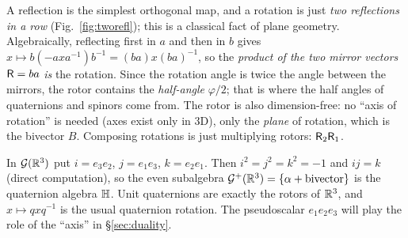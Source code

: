 

\begin{intuition}
A reflection is the simplest orthogonal map, and a rotation is just \emph{two reflections in a row} (Fig.~\ref{fig:tworefl}); this is a classical fact of plane geometry.
Algebraically, reflecting first in $a$ and then in $b$ gives $x\mapsto b(-axa^{-1})b^{-1}=(ba)x(ba)^{-1}$, so the \emph{product of the two mirror vectors} $\mathsf{R}=ba$ \emph{is} the rotation.
Since the rotation angle is twice the angle between the mirrors, the rotor contains the \emph{half-angle} $\varphi/2$; that is where the half angles of quaternions and spinors come from. The rotor is also dimension-free: no ``axis of rotation'' is needed (axes exist only in $3$D), only the \emph{plane} of rotation, which is the bivector $B$. Composing rotations is just multiplying rotors: $\mathsf{R}_2\mathsf{R}_1$.
\end{intuition}

\begin{example}
In $\mathcal{G}(\mathbb{R}^3)$ put $i=e_3e_2$, $j=e_1e_3$, $k=e_2e_1$. Then $i^2=j^2=k^2=-1$ and $ij=k$ (direct computation), so the even subalgebra $\mathcal{G}^+(\mathbb{R}^3)=\{\alpha+\text{bivector}\}$ is the quaternion algebra $\mathbb{H}$. Unit quaternions are exactly the rotors of $\mathbb{R}^3$, and $x\mapsto qxq^{-1}$ is the usual quaternion rotation. The pseudoscalar $e_1e_2e_3$ will play the role of the ``axis'' in \S\ref{sec:duality}.
\end{example}
